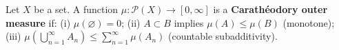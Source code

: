 Let $X$ be a set. A function $\mu : \mathcal{P}(X) \to [0, \infty]$ is a \textbf{Carathéodory outer measure} if:
(i) $\mu(\varnothing) = 0$;
(ii) $A \subset B$ implies $\mu(A) \leq \mu(B)$ (monotone);
(iii) $\mu(\bigcup_{n=1}^{\infty} A_n) \leq \sum_{n=1}^{\infty} \mu(A_n)$ (countable subadditivity).

